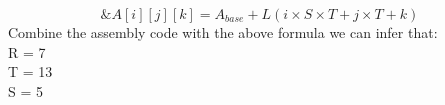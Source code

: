 \documentclass{article}
\begin{document}
\[
\&A[i][j][k] = A_{base} + L(i \times S \times T + j \times T + k)
\]
Combine the assembly code with the above formula we can infer that: \\
R = 7 \\
T = 13 \\
S = 5 \\
\end{document}
